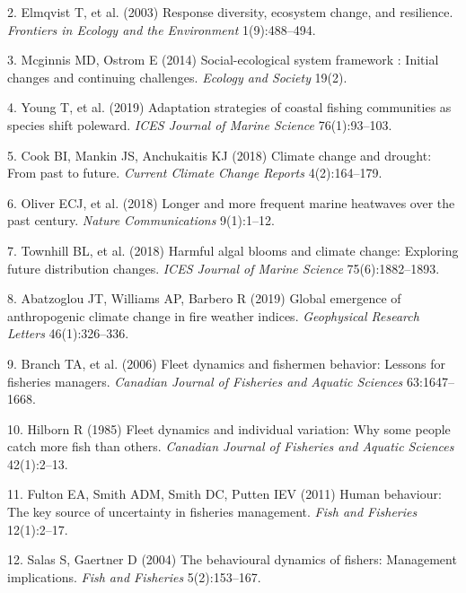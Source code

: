 \documentclass[9pt,twocolumn,twoside,lineno]{pnas-new}
\begin{document}
\leavevmode\hypertarget{ref-Elmqvist2003a}{}%
2. Elmqvist T, et al. (2003) Response diversity, ecosystem change, and
resilience. \emph{Frontiers in Ecology and the Environment}
1(9):488--494.

\leavevmode\hypertarget{ref-Mcginnis2014}{}%
3. Mcginnis MD, Ostrom E (2014) Social-ecological system framework :
Initial changes and continuing challenges. \emph{Ecology and Society}
19(2).

\leavevmode\hypertarget{ref-Young2019}{}%
4. Young T, et al. (2019) Adaptation strategies of coastal fishing
communities as species shift poleward. \emph{ICES Journal of Marine
Science} 76(1):93--103.

\leavevmode\hypertarget{ref-Cook2018}{}%
5. Cook BI, Mankin JS, Anchukaitis KJ (2018) Climate change and drought:
From past to future. \emph{Current Climate Change Reports}
4(2):164--179.

\leavevmode\hypertarget{ref-Oliver2018}{}%
6. Oliver ECJ, et al. (2018) Longer and more frequent marine heatwaves
over the past century. \emph{Nature Communications} 9(1):1--12.

\leavevmode\hypertarget{ref-Townhill2018}{}%
7. Townhill BL, et al. (2018) Harmful algal blooms and climate change:
Exploring future distribution changes. \emph{ICES Journal of Marine
Science} 75(6):1882--1893.

\leavevmode\hypertarget{ref-Abatzoglou2019}{}%
8. Abatzoglou JT, Williams AP, Barbero R (2019) Global emergence of
anthropogenic climate change in fire weather indices. \emph{Geophysical
Research Letters} 46(1):326--336.

\leavevmode\hypertarget{ref-Branch2006}{}%
9. Branch TA, et al. (2006) Fleet dynamics and fishermen behavior:
Lessons for fisheries managers. \emph{Canadian Journal of Fisheries and
Aquatic Sciences} 63:1647--1668.

\leavevmode\hypertarget{ref-Hilborn1985}{}%
10. Hilborn R (1985) Fleet dynamics and individual variation: Why some
people catch more fish than others. \emph{Canadian Journal of Fisheries
and Aquatic Sciences} 42(1):2--13.

\leavevmode\hypertarget{ref-Fulton2011h}{}%
11. Fulton EA, Smith ADM, Smith DC, Putten IEV (2011) Human behaviour:
The key source of uncertainty in fisheries management. \emph{Fish and
Fisheries} 12(1):2--17.

\leavevmode\hypertarget{ref-Salas2004a}{}%
12. Salas S, Gaertner D (2004) The behavioural dynamics of fishers:
Management implications. \emph{Fish and Fisheries} 5(2):153--167.
\end{document}
